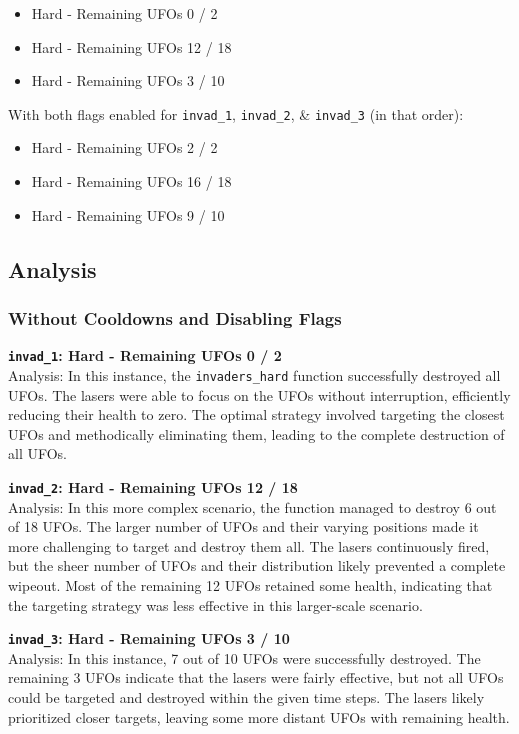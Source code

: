 \documentclass[12pt]{article}
\begin{document}
\begin{itemize}
    \item Hard - Remaining UFOs 0 / 2
    \item Hard - Remaining UFOs 12 / 18
    \item Hard - Remaining UFOs 3 / 10
\end{itemize}

With both flags enabled for \texttt{invad\_1}, \texttt{invad\_2}, \& \texttt{invad\_3} (in that order):

\begin{itemize}
    \item Hard - Remaining UFOs 2 / 2
    \item Hard - Remaining UFOs 16 / 18
    \item Hard - Remaining UFOs 9 / 10
\end{itemize}

\subsection{Analysis}
\subsubsection{Without Cooldowns and Disabling Flags}
\textbf{\texttt{invad\_1}: Hard - Remaining UFOs 0 / 2}\\
Analysis: In this instance, the \texttt{invaders\_hard} function successfully destroyed all UFOs. The lasers were able to focus on the UFOs without interruption, efficiently reducing their health to zero. The optimal strategy involved targeting the closest UFOs and methodically eliminating them, leading to the complete destruction of all UFOs.

\textbf{\texttt{invad\_2}: Hard - Remaining UFOs 12 / 18}\\
Analysis: In this more complex scenario, the function managed to destroy 6 out of 18 UFOs. The larger number of UFOs and their varying positions made it more challenging to target and destroy them all. The lasers continuously fired, but the sheer number of UFOs and their distribution likely prevented a complete wipeout. Most of the remaining 12 UFOs retained some health, indicating that the targeting strategy was less effective in this larger-scale scenario.

\textbf{\texttt{invad\_3}: Hard - Remaining UFOs 3 / 10}\\
Analysis: In this instance, 7 out of 10 UFOs were successfully destroyed. The remaining 3 UFOs indicate that the lasers were fairly effective, but not all UFOs could be targeted and destroyed within the given time steps. The lasers likely prioritized closer targets, leaving some more distant UFOs with remaining health.
\end{document}
